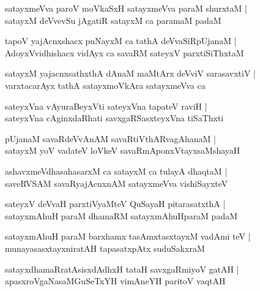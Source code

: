 \documentclass[twoside,12pt,openright]{book}
\newcounter{shloka}[chapter]
\begin{document}
\begin{shloka}%
satayxmeVva paroV moVkaSxH satayxmeVva paraM shurxtaM |\\
satayxM deVvevSu jAgatiR satayxM ca paramaM padaM 
\end{shloka}

\begin{shloka}%
tapoV yajAcnxshacx puNayxM ca tathA deVvaSiRpUjanaM |\\
AdoyxVvidhishacx vidAyx ca savaRM sateyxV parxtiSiThxtaM 
\end{shloka}

\begin{shloka}%
satayxM yajacnxsathxthA dAnaM maMtArx deVviV sarasavxtiV |\\
varxtacarAyx tathA satayxmoVkAra satayxmeVva ca
\end{shloka}

\begin{shloka}%
sateyxVna vAyuraBeyxVti sateyxVna tapateV raviH |\\
sateyxVna cAginxdaRhati savxgaRSasxteyxVna tiSaThxti
\end{shloka}

\begin{shloka}%
pUjanaM savaRdeVvAnAM savaRtiVthARvagAhanaM |\\
satayxM yoV vadateV loVkeV savaRmAponxVtayxsaMshayaH
\end{shloka}

\begin{shloka}%
ashavxmeVdhasahasarxM ca satayxM ca tulayA dhaqtaM |\\
saveRVSAM savaRyajAcnxnAM satayxmeVva vishiSayxteV
\end{shloka}

\begin{shloka}%
sateyxV deVvaH parxtiVyaMteV QuSayaH pitarasatxthA |\\
satayxmAhuH paraM dhamaRM satayxmAhuHparaM padaM 
\end{shloka}

\begin{shloka}%
satayxmAhuH paraM barxhamx tasAmxtasxtayxM vadAmi teV |\\
munayasasxtayxniratAH tapasatxpAtx suduSakxraM 
\end{shloka}

\begin{shloka}%
satayxdhamaRratAsisxdAdhxH tataH savxgaRmiyoV gatAH |\\
apasxroVgaNasaMGuSeTxYH vimAneYH paritoV vaqtAH
\end{shloka}
\end{document}
